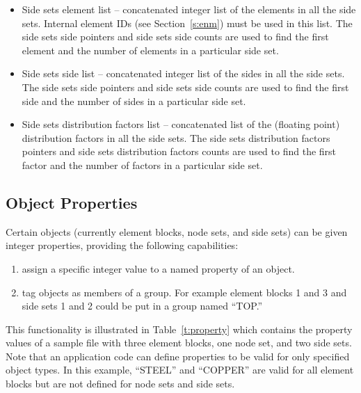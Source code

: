 \begin{itemize}
 \item {Side sets element list -- concatenated integer list of the
 elements in all the side sets.} {Internal element IDs (see
 Section~\ref{s:enm}) must be used in this list.} {The side sets side
 pointers and side sets side counts are used to find the first element
 and the number of elements in a particular side set.}

 \item {Side sets side list -- concatenated integer list of the sides
 in all the side sets. The side sets side pointers and side sets side
 counts are used to find the first side and the number of sides in a
 particular side set.}

 \item {Side sets distribution factors list -- concatenated list of
 the (floating point) distribution factors in all the side sets. The
 side sets distribution factors pointers and side sets distribution
 factors counts are used to find the first factor and the number of
 factors in a particular side set.}
\end{itemize}



\subsection{Object Properties}

Certain \exo{} objects (currently element blocks, node
sets, and side sets) can be given integer properties, providing
the following capabilities:
\begin{enumerate}
\item assign a specific integer value to a named property of
an object.

\item tag objects as members of a group. For example element
blocks 1 and 3 and side sets 1 and 2 could be put in a group
named ``TOP.''
\end{enumerate}

This functionality is illustrated in Table~\ref{t:property} which
contains the property values of a sample
\exo{} file with three element blocks, one node set, and two
side sets. Note that an application code can define properties
to be valid for only specified object types. In this example,
``STEEL'' and ``COPPER'' are valid for all element blocks but are
not defined for node sets and side sets.

